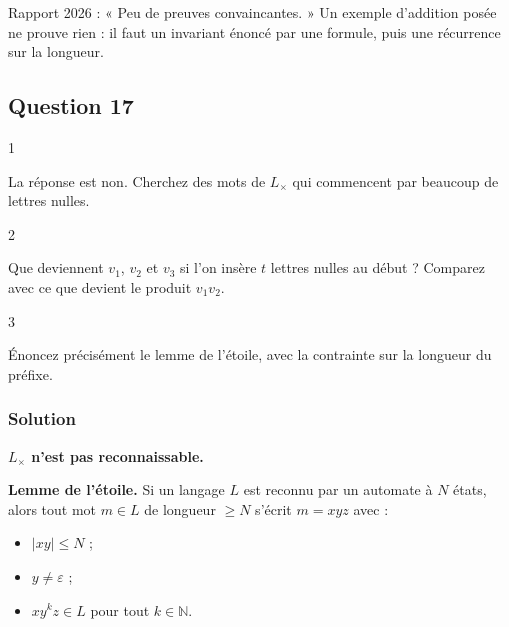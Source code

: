 \documentclass[11pt,a4paper]{article}
\providecommand{\tightlist}{\setlength{\itemsep}{0pt}\setlength{\parskip}{0pt}}
\begin{document}
\begin{jury}

Rapport 2026 : « Peu de preuves convaincantes. » Un exemple d'addition posée ne prouve rien : il faut un invariant énoncé par une formule, puis une récurrence sur la longueur.

\end{jury}

\hypertarget{question-17}{%
\subsection{Question 17}\label{question-17}}

\begin{indication}{1}

La réponse est non. Cherchez des mots de \(L_\times\) qui commencent par beaucoup de lettres nulles.

\end{indication}

\begin{indication}{2}

Que deviennent \(v_1\), \(v_2\) et \(v_3\) si l'on insère \(t\) lettres nulles au début ? Comparez avec ce que devient le produit \(v_1v_2\).

\end{indication}

\begin{indication}{3}

Énoncez précisément le lemme de l'étoile, avec la contrainte sur la longueur du préfixe.

\end{indication}

\hypertarget{solution-16}{%
\subsubsection{Solution}\label{solution-16}}

\textbf{\(L_\times\) n'est pas reconnaissable.}

\textbf{Lemme de l'étoile.} Si un langage \(L\) est reconnu par un automate à \(N\) états, alors tout mot \(m\in L\) de longueur \(\ge N\) s'écrit \(m=xyz\) avec :

\begin{itemize}
\tightlist
\item
  \(\lvert xy\rvert\le N\) ;
\item
  \(y\neq\varepsilon\) ;
\item
  \(xy^kz\in L\) pour tout \(k\in\mathbb{N}\).
\end{itemize}
\end{document}
